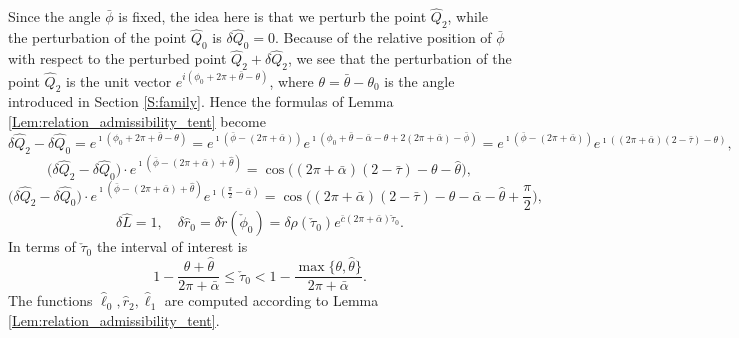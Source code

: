 \documentclass[reqno]{amsart}
\theoremstyle{definition} \newtheorem{definition}{Definition}[section]
\theoremstyle{definition} \newtheorem{remark}[definition]{Remark}
\theoremstyle{plain} \newtheorem{lemma}[definition]{Lemma}
\theoremstyle{plain} \newtheorem{proposition}[definition]{Proposition}
\theoremstyle{plain} \newtheorem{theorem}[definition]{Theorem}
\theoremstyle{plain} \newtheorem{corollary}[definition]{Corollary}
\theoremstyle{definition} \newtheorem{example}[definition]{Example}
\theoremstyle{plain} \newtheorem{claim}[clai]{Claim}
\theoremstyle{definition} \newtheorem{assumption}[definition]{Assumption}
\theoremstyle{definition} \newtheorem{observation}[definition]{Observation}
\newcommand{\1}{\mathbbm 1}
\renewcommand{\i}{\imath}
\numberwithin{equation}{section} %
\theoremstyle{plain} \newtheorem*{theorem*}{Theorem}
\theoremstyle{plain} \newtheorem{mthm}[maintheorem]{Main Theorem}
\theoremstyle{plain} \newtheorem*{mthm*}{Main Theorem}
\theoremstyle{plain} \newtheorem*{conjecture*}{Conjecture}
\theoremstyle{plain} \newtheorem{conjecture}[definition]{Conjecture}
\theoremstyle{plain} \newtheorem*{problem*}{Problem}
\begin{document}
Since the angle $\bar\phi$ is fixed, the idea here is that we perturb the point $\hat Q_2$, while the perturbation of the point $\hat Q_0$ is $\delta\hat Q_0=0$. Because of the relative position of $\bar\phi$ with respect to the perturbed point $\hat Q_2+\delta\hat Q_2$, we see that the perturbation of the point $\hat Q_2$ is the unit vector $e^{i(\phi_0+2\pi+\bar\theta-\theta)}$, where $\theta=\bar\theta-\theta_0$ is the angle introduced in Section \ref{S:family}.
Hence the formulas of Lemma \ref{Lem:relation_admissibility_tent} become %
%
\begin{equation*}
\delta \hat Q_2 - \delta \hat Q_0 = e^{\i (\phi_0 + 2\pi + \bar \theta - \theta)} = e^{\i (\bar \phi - (2\pi + \bar \alpha))} e^{\i (\phi_0 + \bar \theta - \bar \alpha - \theta + 2 (2 \pi + \bar \alpha) - \bar \phi)} = e^{\i (\bar \phi - (2\pi + \bar \alpha))} e^{\i ((2 \pi + \bar \alpha)(2 - \bar \tau) - \theta)},
\end{equation*}
\begin{equation*}
\big( \delta \hat Q_2 - \delta \hat Q_0 \big) \cdot e^{\i (\bar \phi - (2\pi + \bar \alpha) + \hat \theta)} = \cos \big( (2\pi + \bar \alpha) (2 - \bar\tau) - \theta - \hat \theta \big),
\end{equation*}
\begin{equation*}
\big( \delta \hat Q_2 - \delta \hat Q_0 \big) \cdot e^{\i (\bar \phi - (2\pi + \bar \alpha) + \hat \theta)} e^{\i\left(\frac{\pi}{2}-\bar\alpha\right)}= \cos \bigg( (2\pi + \bar \alpha) (2 - \bar\tau) - \theta - \bar \alpha - \hat \theta + \frac{\pi}{2} \bigg),
\end{equation*}
\begin{equation*}
\delta \hat L = 1, \quad \delta \hat r_0 = \delta \tilde r(\check \phi_0) = \delta \rho(\check \tau_0) e^{\bar c (2\pi + \bar \alpha) \check \tau_0}.
\end{equation*}
In terms of $\check \tau_0$ the interval of interest is
\begin{equation*}
1 - \frac{\theta + \hat \theta}{2\pi + \bar \alpha} \leq \check \tau_0 < 1 - \frac{\max\{\theta,\hat \theta\}}{2\pi + \bar \alpha}.
\end{equation*}
The functions $\hat \ell_0,\hat r_2,\hat \ell_1$ are computed according to Lemma \ref{Lem:relation_admissibility_tent}.
\end{document}
